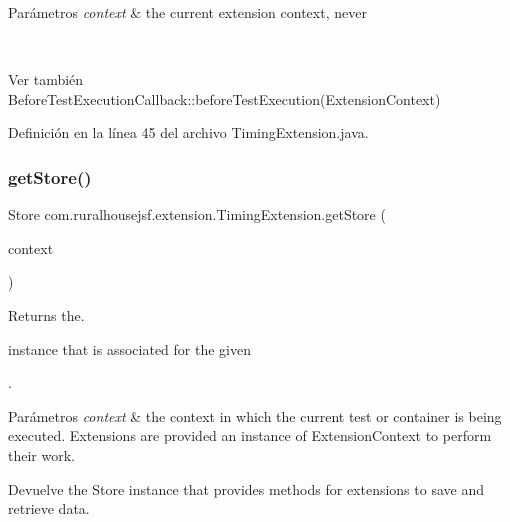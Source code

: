 \begin{DoxyParams}{Parámetros}
{\em context} & the current extension context, never
\begin{DoxyCode}{1}
\DoxyCodeLine{\textcolor{keyword}{null} }
\end{DoxyCode}
\\
\hline
\end{DoxyParams}
\begin{DoxySeeAlso}{Ver también}
Before\+Test\+Execution\+Callback\+::before\+Test\+Execution(\+Extension\+Context) 
\end{DoxySeeAlso}


Definición en la línea 45 del archivo Timing\+Extension.\+java.

\mbox{\label{classcom_1_1ruralhousejsf_1_1extension_1_1_timing_extension_a489c3097fd687a25391189f3fec56fa8}} 
\subsubsection{\texorpdfstring{getStore()}{getStore()}}
{\footnotesize\ttfamily Store com.\+ruralhousejsf.\+extension.\+Timing\+Extension.\+get\+Store (\begin{DoxyParamCaption}\item[{Extension\+Context}]{context }\end{DoxyParamCaption})\hspace{0.3cm}{\ttfamily [private]}}



Returns the. 


\begin{DoxyCode}{0}
\end{DoxyCode}
 instance that is associated for the given 
\begin{DoxyCode}{0}
\end{DoxyCode}
 .


\begin{DoxyParams}{Parámetros}
{\em context} & the context in which the current test or container is being executed. Extensions are provided an instance of Extension\+Context to perform their work.\\
\hline
\end{DoxyParams}
\begin{DoxyReturn}{Devuelve}
the Store instance that provides methods for extensions to save and retrieve data. 
\end{DoxyReturn}


